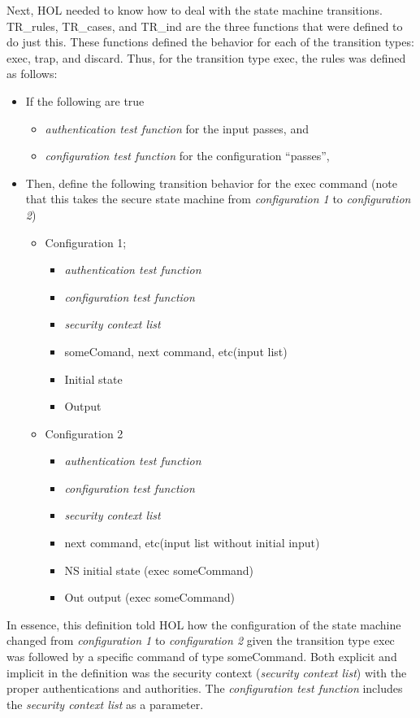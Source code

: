   Next, HOL needed to know how to deal with the state machine transitions. TR_rules, TR_cases, and TR_ind
  are the three functions that were defined to do just this. These functions defined the behavior for
  each of the transition types: exec, trap, and discard. Thus, for the transition type exec, the rules
  was defined as follows:
\begin{itemize}
\item If the following are true
  \begin{itemize}
  \item \textit{authentication test function} for the input passes, and
    \item \textit{configuration test function} for the configuration “passes”,
    \end{itemize}
  \item Then, define the following transition behavior for the exec command (note that this
    takes the secure state machine from \textit{configuration 1} to \textit{configuration 2})
    \begin{itemize}
    \item Configuration 1;
      \begin{itemize}
      \item \textit{authentication test function}
      \item \textit{configuration test function}
      \item \textit{security context list}
      \item \lbrack someComand, next command, etc\rbrack \;(input list)
      \item Initial state
        \item Output
        \end{itemize}
      \item Configuration 2
        \begin{itemize}
        \item \textit{authentication test function}
        \item \textit{configuration test function}
        \item \textit{security context list}
        \item \lbrack next command, etc\rbrack \;(input list without initial input)
        \item NS initial state (exec someCommand)
          \item Out output (exec someCommand)
        \end{itemize}
    \end{itemize}
  \end{itemize}
  In essence, this definition told HOL how the configuration of the state machine changed from
  \textit{configuration 1} to \textit{configuration 2} given the transition type exec was followed by a specific
  command of type someCommand. Both explicit and implicit in the definition was the security context
  (\textit{security context list}) with the proper authentications and authorities. The \textit{configuration test
  function} includes the \textit{security context list} as a parameter.\\

